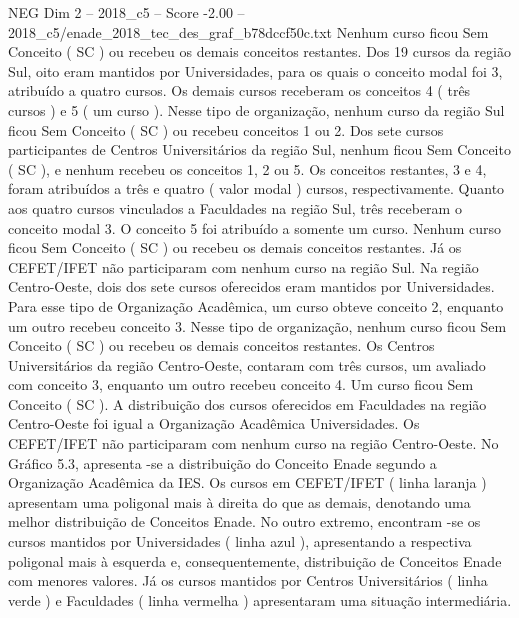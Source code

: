 \begin{textsample}{NEG Dim 2 – 2018\_c5 – Score -2.00 – 2018\_c5/enade\_2018\_tec\_des\_graf\_b78dccf50c.txt}
Nenhum curso ficou Sem Conceito ( SC ) ou recebeu os demais conceitos restantes.
Dos 19 cursos da região Sul, oito eram mantidos por Universidades, para os quais o conceito modal foi 3, atribuído a quatro cursos.
Os demais cursos receberam os conceitos 4 ( três cursos ) e 5 ( um curso ).
Nesse tipo de organização, nenhum curso da região Sul ficou Sem Conceito ( SC ) ou recebeu conceitos 1 ou 2.
Dos sete cursos participantes de Centros Universitários da região Sul, nenhum ficou Sem Conceito ( SC ), e nenhum recebeu os conceitos 1, 2 ou 5.
Os conceitos restantes, 3 e 4, foram atribuídos a três e quatro ( valor modal ) cursos, respectivamente.
Quanto aos quatro cursos vinculados a Faculdades na região Sul, três receberam o conceito modal 3.
O conceito 5 foi atribuído a somente um curso.
Nenhum curso ficou Sem Conceito ( SC ) ou recebeu os demais conceitos restantes.
Já os CEFET/IFET não participaram com nenhum curso na região Sul.
Na região Centro-Oeste, dois dos sete cursos oferecidos eram mantidos por Universidades.
Para esse tipo de Organização Acadêmica, um curso obteve conceito 2, enquanto um outro recebeu conceito 3.
Nesse tipo de organização, nenhum curso ficou Sem Conceito ( SC ) ou recebeu os demais conceitos restantes.
Os Centros Universitários da região Centro-Oeste, contaram com três cursos, um avaliado com conceito 3, enquanto um outro recebeu conceito 4.
Um curso ficou Sem Conceito ( SC ).
A distribuição dos cursos oferecidos em Faculdades na região Centro-Oeste foi igual a Organização Acadêmica Universidades.
Os CEFET/IFET não participaram com nenhum curso na região Centro-Oeste.
No Gráfico 5.3, apresenta -se a distribuição do Conceito Enade segundo a Organização Acadêmica da IES.
Os cursos em CEFET/IFET ( linha laranja ) apresentam uma poligonal mais à direita do que as demais, denotando uma melhor distribuição de Conceitos Enade.
No outro extremo, encontram -se os cursos mantidos por Universidades ( linha azul ), apresentando a respectiva poligonal mais à esquerda e, consequentemente, distribuição de Conceitos Enade com menores valores.
Já os cursos mantidos por Centros Universitários ( linha verde ) e Faculdades ( linha vermelha ) apresentaram uma situação intermediária.

\end{textsample}
